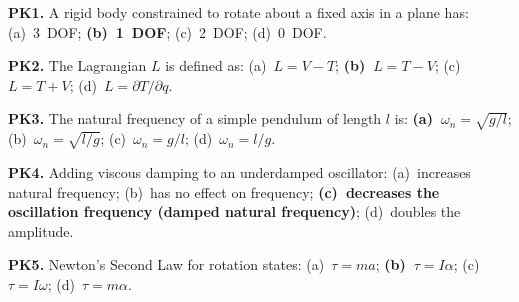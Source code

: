 \documentclass[utf8]{FrontiersinHarvard}
\begin{document}
\textbf{PK1.} A rigid body constrained to rotate about a fixed axis in a
plane has: (a)~3~DOF; \textbf{(b)~1~DOF}; (c)~2~DOF; (d)~0~DOF.

\textbf{PK2.} The Lagrangian $L$ is defined as: (a)~$L = V - T$;
\textbf{(b)~$L = T - V$}; (c)~$L = T + V$; (d)~$L = \partial T/\partial q$.

\textbf{PK3.} The natural frequency of a simple pendulum of length $l$
is: \textbf{(a)~$\omega_n = \sqrt{g/l}$}; (b)~$\omega_n = \sqrt{l/g}$;
(c)~$\omega_n = g/l$; (d)~$\omega_n = l/g$.

\textbf{PK4.} Adding viscous damping to an underdamped oscillator:
(a)~increases natural frequency; (b)~has no effect on frequency;
\textbf{(c)~decreases the oscillation frequency (damped natural frequency)};
(d)~doubles the amplitude.

\textbf{PK5.} Newton's Second Law for rotation states:
(a)~$\tau = ma$; \textbf{(b)~$\tau = I\alpha$};
(c)~$\tau = I\omega$; (d)~$\tau = m\alpha$.
\end{document}
